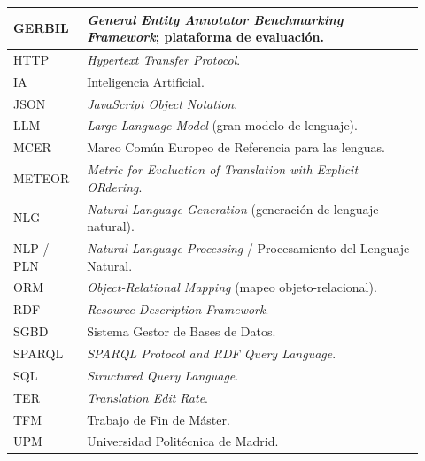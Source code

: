 \begin{longtable}{|p{0.16\linewidth}|p{0.76\linewidth}|}
	GERBIL         & \textit{General Entity Annotator Benchmarking Framework}; plataforma de evaluación.           \\ \hline
	HTTP           & \textit{Hypertext Transfer Protocol}.                                                         \\ \hline
	IA             & Inteligencia Artificial.                                                                      \\ \hline
	JSON           & \textit{JavaScript Object Notation}.                                                          \\ \hline
	LLM            & \textit{Large Language Model} (gran modelo de lenguaje).                                      \\ \hline
	MCER           & Marco Común Europeo de Referencia para las lenguas.                                           \\ \hline
	METEOR         & \textit{Metric for Evaluation of Translation with Explicit ORdering}.                         \\ \hline
	NLG            & \textit{Natural Language Generation} (generación de lenguaje natural).                        \\ \hline
	NLP / PLN      & \textit{Natural Language Processing} / Procesamiento del Lenguaje Natural.                    \\ \hline
	ORM            & \textit{Object-Relational Mapping} (mapeo objeto-relacional).                                 \\ \hline
	RDF            & \textit{Resource Description Framework}.                                                      \\ \hline
	SGBD           & Sistema Gestor de Bases de Datos.                                                             \\ \hline
	SPARQL         & \textit{SPARQL Protocol and RDF Query Language}.                                              \\ \hline
	SQL            & \textit{Structured Query Language}.                                                           \\ \hline
	TER            & \textit{Translation Edit Rate}.                                                               \\ \hline
	TFM            & Trabajo de Fin de Máster.                                                                     \\ \hline
	UPM            & Universidad Politécnica de Madrid.                                                            \\ \hline

\end{longtable}
